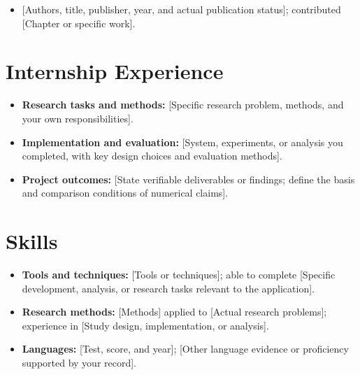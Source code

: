 \documentclass[english]{academic-cv}
\begin{document}
\begin{itemize}
  \item {[Authors, title, publisher, year, and actual publication status]}; contributed [Chapter or specific work].
\end{itemize}

\section{Internship Experience}

\begin{itemize}
  \item \textbf{Research tasks and methods:} [Specific research problem, methods, and your own responsibilities].
  \item \textbf{Implementation and evaluation:} [System, experiments, or analysis you completed, with key design choices and evaluation methods].
  \item \textbf{Project outcomes:} [State verifiable deliverables or findings; define the basis and comparison conditions of numerical claims].
\end{itemize}

\section{Skills}

\begin{itemize}
  \item \textbf{Tools and techniques:} [Tools or techniques]; able to complete [Specific development, analysis, or research tasks relevant to the application].
  \item \textbf{Research methods:} [Methods] applied to [Actual research problems]; experience in [Study design, implementation, or analysis].
  \item \textbf{Languages:} [Test, score, and year]; [Other language evidence or proficiency supported by your record].
\end{itemize}

\end{document}
